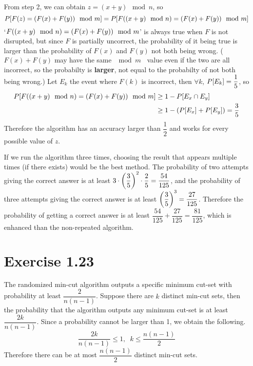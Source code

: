 \documentclass{article}
\begin{document}
\vspace{2mm}
\noindent From step 2, we can obtain $z = (x + y) \mod{n}$, so
$$P\qty[F(z) = \qty(F(x) + F(y)) \mod{m}] = P\qty[F((x + y) \mod{n}) = \qty(F(x) + F(y)) \mod{m}]$$
`$F((x + y) \mod{n}) = \qty(F(x) + F(y)) \mod{m}$' is always true when $F$ is not disrupted, but since $F$ is partially uncorrect, the probability of it being true is larger than the probability of $F(x)$ and $F(y)$ not both being wrong.
($F(x) + F(y)$ may have the same $\mod{m}\;\;$ value even if the two are all incorrect, so the probabilty is \textbf{larger}, not equal to the probabilty of not both being wrong.)
Let $E_k$ the event where $F(k)$ is incorrect, then $\forall k$, $P\qty[E_k] = \dfrac{1}{5}$, so
\begin{align*}
  P\qty[F((x + y) \mod{n}) = \qty(F(x) + F(y)) \mod{m}] &\geq 1 - P\qty[E_x \cap E_y] \\
  &\geq 1 - \qty(P\qty[E_x] + P\qty[E_y]) = \frac{3}{5}
\end{align*}
Therefore the algorithm has an accuracy larger than $\dfrac{1}{2}$ and works for every possible value of $z$.

\vspace{2mm}
\noindent If we run the algorithm three times, choosing the result that appears multiple times (if there exists) would be the best method.
The probability of two attempts giving the correct answer is at least $3 \cdot \qty(\dfrac{3}{5})^2 \cdot \dfrac{2}{5} = \dfrac{54}{125}$, and the probability of three attempts giving the correct answer is at least $\qty(\dfrac{3}{5})^3 = \dfrac{27}{125}$.
Therefore the probability of getting a correct answer is at least $\dfrac{54}{125} + \dfrac{27}{125} = \dfrac{81}{125}$, which is enhanced than the non-repeated algorithm.


\section*{Exercise 1.23}
The randomized min-cut algorithm outputs a specific minimum cut-set with probability at least $\dfrac{2}{n(n-1)}$.
Suppose there are $k$ distinct min-cut sets, then the probability that the algorithm outputs any minimum cut-set is at least $\dfrac{2k}{n(n-1)}$.
Since a probability cannot be larger than 1, we obtain the following.
$$\frac{2k}{n(n-1)} \leq 1, \;\; k \leq \frac{n(n-1)}{2}$$
Therefore there can be at most $\dfrac{n(n-1)}{2}$ distinct min-cut sets.
\end{document}
